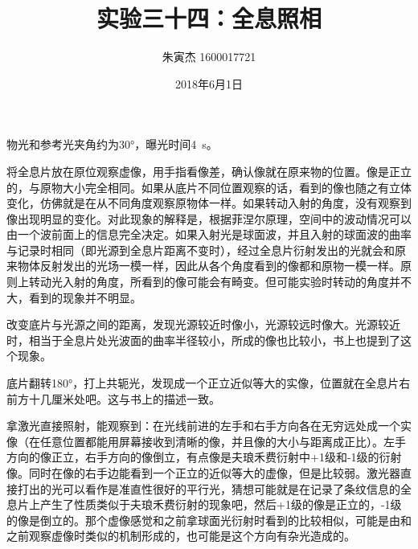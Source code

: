 \documentclass[UTF8]{ctexart}
\title{实验三十四：全息照相}
\author{朱寅杰 1600017721}
\date{2018年6月1日}
\begin{document}
\maketitle
\setcounter{section}{34}
物光和参考光夹角约为30°，曝光时间\SI{4}{\second}。

将全息片放在原位观察虚像，用手指看像差，确认像就在原来物的位置。像是正立的，与原物大小完全相同。如果从底片不同位置观察的话，看到的像也随之有立体变化，仿佛就是在从不同角度观察原物体一样。如果转动入射的角度，没有观察到像出现明显的变化。对此现象的解释是，根据菲涅尔原理，空间中的波动情况可以由一个波前面上的信息完全决定。如果入射光是球面波，并且入射的球面波的曲率与记录时相同（即光源到全息片距离不变时），经过全息片衍射发出的光就会和原来物体反射发出的光场一模一样，因此从各个角度看到的像都和原物一模一样。原则上转动光入射的角度，所看到的像可能会有畸变。但可能实验时转动的角度并不大，看到的现象并不明显。

改变底片与光源之间的距离，发现光源较近时像小，光源较远时像大。光源较近时，相当于全息片处光波面的曲率半径较小，所成的像也比较小，书上也提到了这个现象。

底片翻转180°，打上共轭光，发现成一个正立近似等大的实像，位置就在全息片右前方十几厘米处吧。这与书上的描述一致。

拿激光直接照射，能观察到：在光线前进的左手和右手方向各在无穷远处成一个实像（在任意位置都能用屏幕接收到清晰的像，并且像的大小与距离成正比）。左手方向的像正立，右手方向的像倒立，有点像是夫琅禾费衍射中+1级和-1级的衍射像。同时在像的右手边能看到一个正立的近似等大的虚像，但是比较弱。激光器直接打出的光可以看作是准直性很好的平行光，猜想可能就是在记录了条纹信息的全息片上产生了性质类似于夫琅禾费衍射的现象吧，然后+1级的像是正立的，-1级的像是倒立的。那个虚像感觉和之前拿球面光衍射时看到的比较相似，可能是由和之前观察虚像时类似的机制形成的，也可能是这个方向有杂光造成的。
\end{document}
